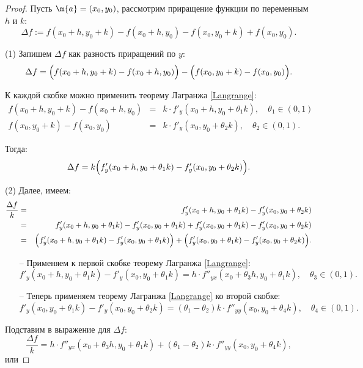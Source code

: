 \begin{proof}
    Пусть $\m{a} = (x_0,y_0)$, рассмотрим приращение функции по переменным \( h \) и \( k \):  
   \[
   \Delta f := f(x_0+h, y_0+k) - f(x_0+h, y_0) - f(x_0, y_0+k) + f(x_0, y_0).
   \]

(1) Запишем \(\Delta f\) как разность приращений по \(y\):  
\[
\Delta f = \Bigl(f(x_0+h, y_0+k) - f(x_0+h, y_0)\Bigr) - \Bigl(f(x_0, y_0+k) - f(x_0, y_0)\Bigr).
\]  

К каждой скобке можно применить теорему Лагранжа \ref{Langrange}:
\begin{eqnarray*}
f(x_0+h, y_0+k) - f(x_0+h, y_0) &=& k \cdot f'_y(x_0+h, y_0 + \theta_1 k), \quad \theta_1 \in (0, 1)    \\
f(x_0, y_0+k) - f(x_0, y_0) &=& k \cdot f'_y(x_0, y_0 + \theta_2 k), \quad \theta_2 \in (0, 1).
\end{eqnarray*}

Тогда:  
\[
\Delta f = k \Bigl(f'_y(x_0+h, y_0 + \theta_1 k) - f'_y(x_0, y_0 + \theta_2 k)\Bigr).
\]

(2) Далее, имеем:
\begin{eqnarray*}
    \frac{\Delta f}{k} &=& f'_y(x_0+h, y_0 + \theta_1 k) - f'_y(x_0, y_0 + \theta_2 k) \\
    &=&f'_y(x_0+h, y_0 + \theta_1 k) - f'_y(x_0, y_0 + \theta_1 k) + f'_y(x_0, y_0 + \theta_1 k) - f'_y(x_0, y_0 + \theta_2 k) \\
    &=& \Bigl(f'_y(x_0+h, y_0 + \theta_1 k) - f'_y(x_0, y_0 + \theta_1 k)\Bigr) + \Bigl( f'_y(x_0, y_0 + \theta_1 k) - f'_y(x_0, y_0 + \theta_2 k) \Bigr).
\end{eqnarray*}


\begin{itemize}
\item[--] Применяем к первой скобке теорему Лагранжа \ref{Langrange}:  
\[
f'_y(x_0+h, y_0 + \theta_1 k) - f'_y(x_0, y_0 + \theta_1 k) = h \cdot f''_{yx}(x_0 + \theta_3 h, y_0 + \theta_1 k), \quad \theta_3 \in (0, 1).
\]
\item[--] Теперь применяем теорему Лагранжа \ref{Langrange} ко второй скобке:  
\[
f'_y(x_0, y_0 + \theta_1 k) - f'_y(x_0, y_0 + \theta_2 k) = (\theta_1 - \theta_2)k \cdot f''_{yy}(x_0, y_0 + \theta_4 k), \quad \theta_4 \in (0, 1).
\]
\end{itemize}

Подставим в выражение для \(\Delta f\):  
\[
\frac{\Delta f}{k} =h \cdot f''_{yx}(x_0 + \theta_3 h, y_0 + \theta_1 k) + (\theta_1 - \theta_2)k \cdot f''_{yy}(x_0, y_0 + \theta_4 k),
\]
или


\end{proof}
